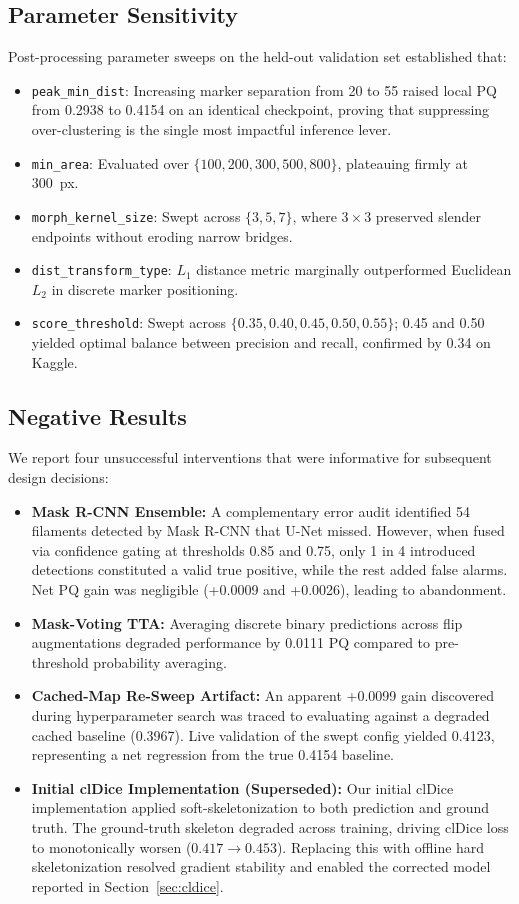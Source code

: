 \documentclass[sigconf]{acmart}
\begin{document}
\subsection{Parameter Sensitivity}
Post-processing parameter sweeps on the held-out validation set established that:
\begin{itemize}
    \item \texttt{peak\_min\_dist}: Increasing marker separation from 20 to 55 raised local PQ from 0.2938 to 0.4154 on an identical checkpoint, proving that suppressing over-clustering is the single most impactful inference lever.
    \item \texttt{min\_area}: Evaluated over $\{100, 200, 300, 500, 800\}$, plateauing firmly at 300~px.
    \item \texttt{morph\_kernel\_size}: Swept across $\{3, 5, 7\}$, where $3\times3$ preserved slender endpoints without eroding narrow bridges.
    \item \texttt{dist\_transform\_type}: $L_1$ distance metric marginally outperformed Euclidean $L_2$ in discrete marker positioning.
    \item \texttt{score\_threshold}: Swept across $\{0.35, 0.40, 0.45, 0.50, 0.55\}$; 0.45 and 0.50 yielded optimal balance between precision and recall, confirmed by 0.34 on Kaggle.
\end{itemize}

\subsection{Negative Results}\label{sec:negative_results}
We report four unsuccessful interventions that were informative for subsequent design decisions:
\begin{itemize}
    \item \textbf{Mask R-CNN Ensemble:} A complementary error audit identified 54 filaments detected by Mask R-CNN that U-Net missed. However, when fused via confidence gating at thresholds 0.85 and 0.75, only 1 in 4 introduced detections constituted a valid true positive, while the rest added false alarms. Net PQ gain was negligible (+0.0009 and +0.0026), leading to abandonment.
    \item \textbf{Mask-Voting TTA:} Averaging discrete binary predictions across flip augmentations degraded performance by 0.0111 PQ compared to pre-threshold probability averaging.
    \item \textbf{Cached-Map Re-Sweep Artifact:} An apparent +0.0099 gain discovered during hyperparameter search was traced to evaluating against a degraded cached baseline (0.3967). Live validation of the swept config yielded 0.4123, representing a net regression from the true 0.4154 baseline.
    \item \textbf{Initial clDice Implementation (Superseded):} Our initial clDice implementation applied soft-skeletonization to both prediction and ground truth. The ground-truth skeleton degraded across training, driving clDice loss to monotonically worsen ($0.417\to0.453$). Replacing this with offline hard skeletonization resolved gradient stability and enabled the corrected model reported in Section~\ref{sec:cldice}.
\end{itemize}
\end{document}
